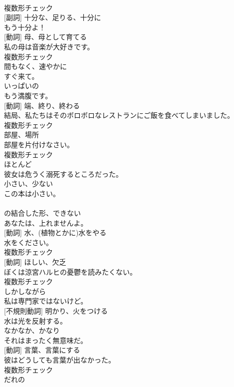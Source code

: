 \documentclass[8pt]{extreport}
\begin{document}
\begin{CJK}{UTF8}{min}
\\	複数形チェック
\\	[形容詞] [副詞]	十分な、足りる、十分に	
\\	もう十分よ！	
\\	[名詞] [動詞]	母、母として育てる	
\\	私の母は音楽が大好きです。	
\\	複数形チェック
\\	[副詞]	間もなく、速やかに	
\\	すぐ来て。	
\\	[形容詞]	いっぱいの	
\\	もう満腹です。	
\\	[名詞] [動詞]	端、終り、終わる	
\\	結局、私たちはそのボロボロなレストランにご飯を食べてしまいました。	
\\	複数形チェック
\\	[名詞]	部屋、場所	
\\	部屋を片付けなさい。	
\\	複数形チェック
\\	[副詞]	ほとんど	
\\	彼女は危うく溺死するところだった。	
\\	[形容詞]	小さい、少ない	
\\	この本は小さい。	
\\	[短縮形]	
\\	の結合した形、できない	
\\	あなたは、上れませんよ。	
\\	[名詞] [動詞]	水、(植物とかに)水をやる	
\\	水をください。	
\\	複数形チェック
\\	[名詞] [動詞]	ほしい、欠乏	
\\	ぼくは涼宮ハルヒの憂鬱を読みたくない。	
\\	複数形チェック
\\	[副詞]	しかしながら	
\\	私は専門家ではないけど。	
\\	[動詞] [不規則動詞]	明かり、火をつける	
\\	水は光を反射する。	
\\	[副詞]	なかなか、かなり	
\\	それはまったく無意味だ。	
\\	[名詞] [動詞]	言葉、言葉にする	
\\	彼はどうしても言葉が出なかった。	
\\	複数形チェック
\\	[代名詞]	だれの	

\end{CJK}
\end{document}
